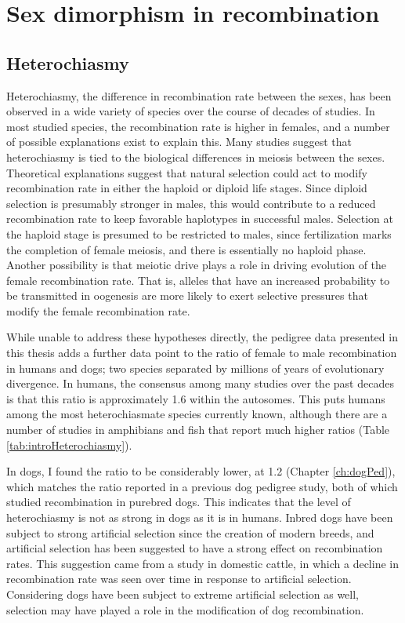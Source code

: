 \section{Sex dimorphism in recombination}

\subsection{Heterochiasmy}

Heterochiasmy, the difference in recombination rate between the sexes, has been observed in a wide variety of species over the course of decades of studies.
In most studied species, the recombination rate is higher in females, and a number of possible explanations exist to explain this.
Many studies suggest that heterochiasmy is tied to the biological differences in meiosis between the sexes.
Theoretical explanations suggest that natural selection could act to modify recombination rate in either the haploid or diploid life stages.
Since diploid selection is presumably stronger in males, this would contribute to a reduced recombination rate to keep favorable haplotypes in successful males\cite{Trivers1988}.
Selection at the haploid stage is presumed to be restricted to males, since fertilization marks the completion of female meiosis, and there is essentially no haploid phase\cite{Lenormand2005}.
Another possibility is that meiotic drive plays a role in driving evolution of the female recombination rate.
That is, alleles that have an increased probability to be transmitted in oogenesis are more likely to exert selective pressures that modify the female recombination rate\cite{Brandvain2012}.

While unable to address these hypotheses directly, the pedigree data presented in this thesis adds a further data point to the ratio of female to male recombination in humans and dogs; two species separated by millions of years of evolutionary divergence.
In humans, the consensus among many studies over the past decades is that this ratio is approximately 1.6 within the autosomes.
This puts humans among the most heterochiasmate species currently known, although there are a number of studies in amphibians and fish that report much higher ratios (Table \ref{tab:introHeterochiasmy}).

In dogs, I found the ratio to be considerably lower, at 1.2 (Chapter \ref{ch:dogPed}), which matches the ratio reported in a previous dog pedigree study\cite{Wong2010}, both of which studied recombination in purebred dogs.
This indicates that the level of heterochiasmy is not as strong in dogs as it is in humans.
Inbred dogs have been subject to strong artificial selection since the creation of modern breeds, and artificial selection has been suggested to have a strong effect on recombination rates.
This suggestion came from a study in domestic cattle, in which a decline in recombination rate was seen over time in response to artificial selection\cite{Ma2015}.
Considering dogs have been subject to extreme artificial selection as well, selection may have played a role in the modification of dog recombination.


